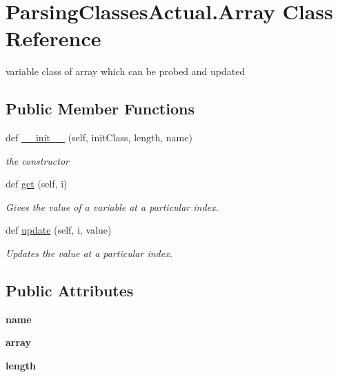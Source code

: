 \hypertarget{class_parsing_classes_actual_1_1_array}{}\section{Parsing\+Classes\+Actual.\+Array Class Reference}
\label{class_parsing_classes_actual_1_1_array}


variable class of array which can be probed and updated  


\subsection*{Public Member Functions}
\begin{DoxyCompactItemize}
\item 
def \hyperlink{class_parsing_classes_actual_1_1_array_a749c8cc0cbee51cd8ac220c3afe4cccb}{\+\_\+\+\_\+init\+\_\+\+\_\+} (self, init\+Class, length, name)
\begin{DoxyCompactList}\small\item\em the constructor \end{DoxyCompactList}\item 
def \hyperlink{class_parsing_classes_actual_1_1_array_a0c67900f761bc072ed1f2a49ead7a0da}{get} (self, i)
\begin{DoxyCompactList}\small\item\em Gives the value of a variable at a particular index. \end{DoxyCompactList}\item 
def \hyperlink{class_parsing_classes_actual_1_1_array_a2a61097f1b529f1bdc8dcc4639e44414}{update} (self, i, value)
\begin{DoxyCompactList}\small\item\em Updates the value at a particular index. \end{DoxyCompactList}\end{DoxyCompactItemize}
\subsection*{Public Attributes}
\begin{DoxyCompactItemize}
\item 
\mbox{\label{class_parsing_classes_actual_1_1_array_a0bc21e5ecf1ea116733950ea94fd355a}} 
{\bfseries name}
\item 
\mbox{\label{class_parsing_classes_actual_1_1_array_a14c6e3eeac80e550ac15348387db7d4b}} 
{\bfseries array}
\item 
\mbox{\label{class_parsing_classes_actual_1_1_array_ac70adad351ea231f59e98c7df142e82c}} 
{\bfseries length}
\end{DoxyCompactItemize}


